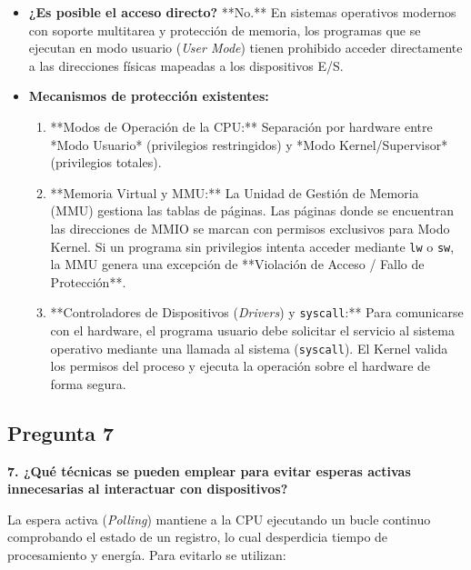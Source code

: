 \documentclass[12pt, letterpaper]{article}
\begin{document}
\begin{itemize}
    \item \textbf{¿Es posible el acceso directo?} **No.** En sistemas operativos modernos con soporte multitarea y protección de memoria, los programas que se ejecutan en modo usuario (\textit{User Mode}) tienen prohibido acceder directamente a las direcciones físicas mapeadas a los dispositivos E/S.
    
    \item \textbf{Mecanismos de protección existentes:}
    \begin{enumerate}
        \item **Modos de Operación de la CPU:** Separación por hardware entre *Modo Usuario* (privilegios restringidos) y *Modo Kernel/Supervisor* (privilegios totales).
        \item **Memoria Virtual y MMU:** La Unidad de Gestión de Memoria (MMU) gestiona las tablas de páginas. Las páginas donde se encuentran las direcciones de MMIO se marcan con permisos exclusivos para Modo Kernel. Si un programa sin privilegios intenta acceder mediante \texttt{lw} o \texttt{sw}, la MMU genera una excepción de **Violación de Acceso / Fallo de Protección**.
        \item **Controladores de Dispositivos (\textit{Drivers}) y \texttt{syscall}:** Para comunicarse con el hardware, el programa usuario debe solicitar el servicio al sistema operativo mediante una llamada al sistema (\texttt{syscall}). El Kernel valida los permisos del proceso y ejecuta la operación sobre el hardware de forma segura.
    \end{enumerate}
\end{itemize}

\hr

\subsection*{Pregunta 7}
\textbf{7. ¿Qué técnicas se pueden emplear para evitar esperas activas innecesarias al interactuar con dispositivos?}

La espera activa (\textit{Polling}) mantiene a la CPU ejecutando un bucle continuo comprobando el estado de un registro, lo cual desperdicia tiempo de procesamiento y energía. Para evitarlo se utilizan:
\end{document}

